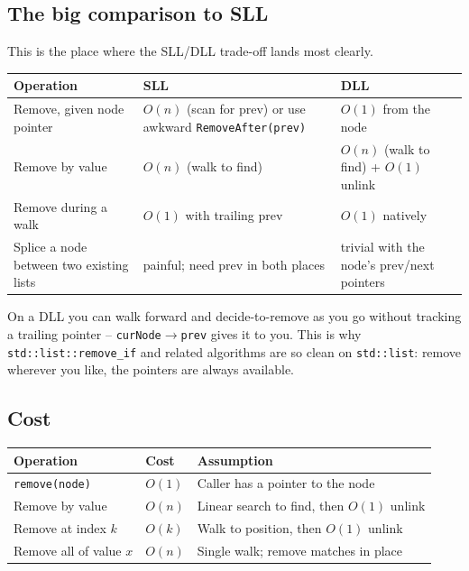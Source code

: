 \documentclass[11pt]{article}
\begin{document}
\subsection{The big comparison to SLL}

This is the place where the SLL/DLL trade-off lands most clearly.

\begin{center}
\footnotesize
\renewcommand{\arraystretch}{1.3}
\begin{tabular}{@{}p{4.3cm}p{3.5cm}p{3.5cm}@{}}
\hline
\textbf{Operation}             & \textbf{SLL}          & \textbf{DLL} \\
\hline
Remove, given node pointer     & $O(n)$ (scan for prev) or use awkward \texttt{RemoveAfter(prev)} & $O(1)$ from the node \\
Remove by value                 & $O(n)$ (walk to find) & $O(n)$ (walk to find) + $O(1)$ unlink \\
Remove during a walk           & $O(1)$ with trailing prev & $O(1)$ natively \\
Splice a node between two existing lists & painful; need prev in both places & trivial with the node's prev/next pointers \\
\hline
\end{tabular}
\end{center}

\begin{ideabox}
On a DLL you can walk forward and decide-to-remove as you go
without tracking a trailing pointer -- \texttt{curNode$\to$prev}
gives it to you. This is why \texttt{std::list::remove\_if} and
related algorithms are so clean on \texttt{std::list}: remove
wherever you like, the pointers are always available.
\end{ideabox}

\subsection{Cost}

\begin{center}
\footnotesize
\renewcommand{\arraystretch}{1.3}
\begin{tabular}{@{}lll@{}}
\hline
\textbf{Operation}          & \textbf{Cost} & \textbf{Assumption} \\
\hline
\texttt{remove(node)}       & $O(1)$        & Caller has a pointer to the node \\
Remove by value              & $O(n)$        & Linear search to find, then $O(1)$ unlink \\
Remove at index $k$          & $O(k)$        & Walk to position, then $O(1)$ unlink \\
Remove all of value $x$      & $O(n)$        & Single walk; remove matches in place \\
\hline
\end{tabular}
\end{center}
\end{document}
